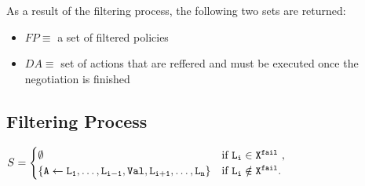 \documentclass{article}
\newcommand{\s}[1]{\ensuremath{\mathtt{#1}}}
\begin{document}
As a result of the filtering process, the following two sets are returned:
\begin{itemize}
\item $FP \equiv$ a set of filtered policies
\item $DA \equiv$ set of actions that are reffered and must be executed once the negotiation is finished
\end{itemize}

\subsection{Filtering Process}



\newpage

\begin{landscape}
$S = \begin{cases}
                \emptyset & \text{if \s{L_i \in X^{fail}} },\\ 
                \s{\{ A\leftarrow L_1,\ldots,L_{i-1},Val,L_{i+1},\ldots,L_n\}} & \text{if \s{L_i \notin X^{fail}}}.
           \end{cases}$

\end{landscape}
\end{document}
